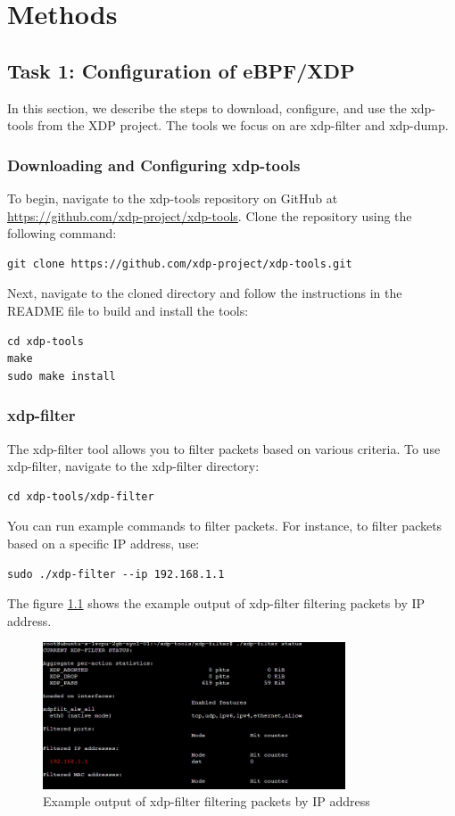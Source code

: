 \chapter{Methods}\label{chap:methods}
\section{Task 1: Configuration of eBPF/XDP }
In this section, we describe the steps to download, configure, and use the xdp-tools from the XDP project. The tools we focus on are xdp-filter and xdp-dump.

\subsection{Downloading and Configuring xdp-tools}
To begin, navigate to the xdp-tools repository on GitHub at \url{https://github.com/xdp-project/xdp-tools}. Clone the repository using the following command:
\begin{verbatim}
git clone https://github.com/xdp-project/xdp-tools.git
\end{verbatim}

Next, navigate to the cloned directory and follow the instructions in the README file to build and install the tools:
\begin{verbatim}
cd xdp-tools
make
sudo make install
\end{verbatim}

\subsection{xdp-filter}
The xdp-filter tool allows you to filter packets based on various criteria. To use xdp-filter, navigate to the xdp-filter directory:
\begin{verbatim}
cd xdp-tools/xdp-filter
\end{verbatim}

You can run example commands to filter packets. For instance, to filter packets based on a specific IP address, use:
\begin{verbatim}
sudo ./xdp-filter --ip 192.168.1.1
\end{verbatim}
The figure \ref{fig:xdp-filter-example} shows the example output of xdp-filter filtering packets by IP address.
\begin{figure}[H]
    \centering
    \includegraphics[width=0.8\textwidth]{../images/xdp-filter-ip.jpeg}
    \caption{Example output of xdp-filter filtering packets by IP address}
    \label{fig:xdp-filter-example}
\end{figure}

